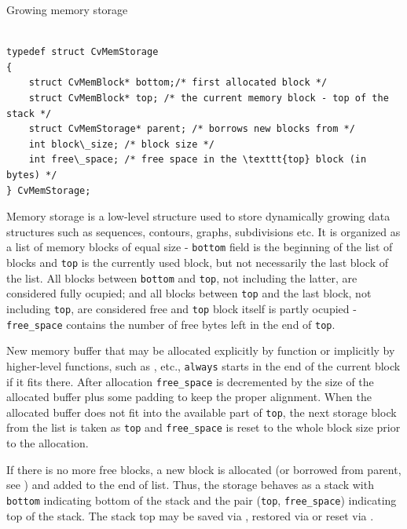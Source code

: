 \label{CvMemStorage}

Growing memory storage

\begin{lstlisting}

typedef struct CvMemStorage
{
    struct CvMemBlock* bottom;/* first allocated block */
    struct CvMemBlock* top; /* the current memory block - top of the stack */
    struct CvMemStorage* parent; /* borrows new blocks from */
    int block\_size; /* block size */
    int free\_space; /* free space in the \texttt{top} block (in bytes) */
} CvMemStorage;

\end{lstlisting}

Memory storage is a low-level structure used to store dynamically growing
data structures such as sequences, contours, graphs, subdivisions etc. It
is organized as a list of memory blocks of equal size - \texttt{bottom}
field is the beginning of the list of blocks and \texttt{top} is the
currently used block, but not necessarily the last block of the list. All
blocks between \texttt{bottom} and \texttt{top}, not including the
latter, are considered fully ocupied; and all blocks between \texttt{top}
and the last block, not including \texttt{top}, are considered free
and \texttt{top} block itself is partly ocupied - \texttt{free\_space}
contains the number of free bytes left in the end of \texttt{top}.

New memory buffer that may be allocated explicitly by
 function or implicitly by higher-level functions,
such as ,  etc., \texttt{always}
starts in the end of the current block if it fits there. After allocation
\texttt{free\_space} is decremented by the size of the allocated buffer
plus some padding to keep the proper alignment. When the allocated buffer
does not fit into the available part of \texttt{top}, the next storage
block from the list is taken as \texttt{top} and \texttt{free\_space}
is reset to the whole block size prior to the allocation.

If there is no more free blocks, a new block is allocated (or borrowed
from parent, see ) and added to the end of
list. Thus, the storage behaves as a stack with \texttt{bottom} indicating
bottom of the stack and the pair (\texttt{top}, \texttt{free\_space})
indicating top of the stack. The stack top may be saved via
, restored via 
or reset via .

